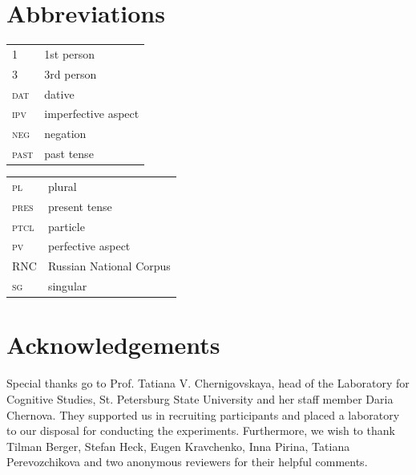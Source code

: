 \documentclass[output=paper,
colorlinks,
citecolor=brown,
newtxmath,
hidelinks
]{langscibook}
\begin{document}
\section*{Abbreviations}

\begin{tabularx}{.5\textwidth}{@{}lQ@{}}
\textsc{1}&1st person\\
\textsc{3}&3rd person\\
\textsc{dat}&dative\\
\textsc{ipv}&imperfective aspect\\
\textsc{neg}&negation\\
\textsc{past}&past tense\\
\end{tabularx}%
\begin{tabularx}{.5\textwidth}{@{}lQ@{}}
\textsc{pl}&plural\\
\textsc{pres}&present tense\\
\textsc{ptcl}&particle\\
\textsc{pv}&perfective aspect\\
\textsc{RNC}&Russian National Corpus\\
\textsc{sg}&singular\\
\end{tabularx}

\section*{Acknowledgements}
Special thanks go to Prof. Tatiana V. Chernigovskaya, head of the Laboratory for Cognitive Studies, St. Petersburg State University and her staff member Daria Chernova. They supported us in recruiting participants and placed a laboratory to our disposal for conducting the experiments. Furthermore, we wish to thank Tilman Berger, Stefan Heck, Eugen Kravchenko, Inna Pirina, Tatiana Pere\-voz\-chi\-kova and two anonymous reviewers for their helpful comments.


\end{document}
